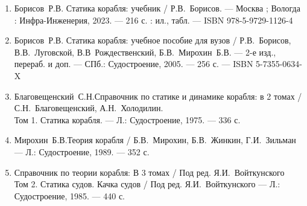 \begin{enumerate}
    \item Борисов~Р.В. Статика корабля: учебник / Р.В.~Борисов. --- Москва ; Вологда : Инфра-Инженерия, 2023. --- 216 с. : ил., табл. --- ISBN 978-5-9729-1126-4
    \item Борисов~Р.В. Статика корабля: учебное пособие для вузов / Р.В.~Борисов, В.В.~Луговской, В.В~Рождественский, Б.В.~Мирохин~Б.В. --- 2-е изд., перераб. и доп. --- СПб.: Судостроение, 2005. --- 256 с. --- ISBN 5-7355-0634-X
    \item Благовещенский~С.Н.Справочник по статике и динамике корабля: в 2 томах / С.Н.~Благовещенский, А.Н.~Холодилин. \\
    Том 1. Статика корабля. --- Л.: Судостроение, 1975. --- 336 с.
    \item Мирохин~Б.В.Теория корабля / Б.В.~Мирохин, Б.В.~Жинкин, Г.И.~Зильман --- Л.: Судостроение, 1989. --- 352 с.
    \item Справочник по теории корабля: В 3 томах / Под ред. Я.И.~Войткунского \\
    Том 2. Статика судов. Качка судов / Под ред. Я.И.~Войткунского --- Л.: Судостроение, 1985. --- 440 с.
\end{enumerate}